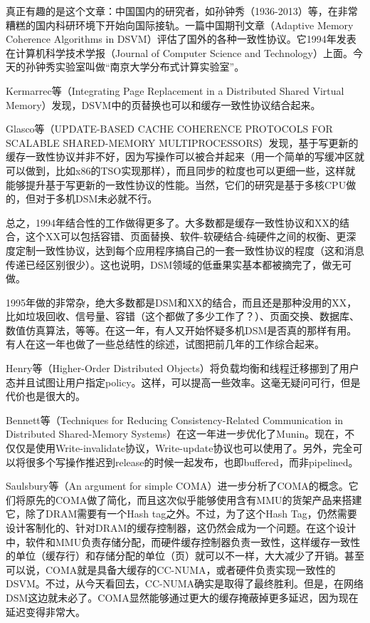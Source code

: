 \documentclass[a4paper,twoside]{scrbook}
\begin{document}
真正有趣的是这个文章：中国国内的研究者，如孙钟秀（1936-2013）等，在非常糟糕的国内科研环境下开始向国际接轨。一篇中国期刊文章（Adaptive Memory Coherence Algorithms in DSVM）评估了国外的各种一致性协议。它1994年发表在计算机科学技术学报（Journal of Computer Science and Technology）上面。今天的孙钟秀实验室叫做“南京大学分布式计算实验室”。


Kermarrec等（Integrating Page Replacement in a Distributed Shared Virtual Memory）发现，DSVM中的页替换也可以和缓存一致性协议结合起来。

Glasco等（UPDATE-BASED CACHE COHERENCE PROTOCOLS FOR SCALABLE SHARED-MEMORY MULTIPROCESSORS）发现，基于写更新的缓存一致性协议并非不好，因为写操作可以被合并起来（用一个简单的写缓冲区就可以做到，比如x86的TSO实现那样），而且同步的粒度也可以更细一些，这样就能够提升基于写更新的一致性协议的性能。当然，它们的研究是基于多核CPU做的，但对于多机DSM未必就不行。

总之，1994年结合性的工作做得更多了。大多数都是缓存一致性协议和XX的结合，这个XX可以包括容错、页面替换、软件-软硬结合-纯硬件之间的权衡、更深度定制一致性协议，达到每个应用程序搞自己的一套一致性协议的程度（这和消息传递已经区别很少）。这也说明，DSM领域的低垂果实基本都被摘完了，做无可做。


1995年做的非常杂，绝大多数都是DSM和XX的结合，而且还是那种没用的XX，比如垃圾回收、信号量、容错（这个都做了多少工作了？）、页面交换、数据库、数值仿真算法，等等。在这一年，有人又开始怀疑多机DSM是否真的那样有用。有人在这一年也做了一些总结性的综述，试图把前几年的工作综合起来。

Henry等（Higher-Order Distributed Objects）将负载均衡和线程迁移挪到了用户态并且试图让用户指定policy。这样，可以提高一些效率。这毫无疑问可行，但是代价也是很大的。

Bennett等（Techniques for Reducing Consistency-Related Communication in Distributed Shared-Memory Systems）在这一年进一步优化了Munin。现在，不仅仅是使用Write-invalidate协议，Write-update协议也可以使用了。另外，完全可以将很多个写操作推迟到release的时候一起发布，也即buffered，而非pipelined。

Saulsbury等（An argument for simple COMA）进一步分析了COMA的概念。它们将原先的COMA做了简化，而且这次似乎能够使用含有MMU的货架产品来搭建它，除了DRAM需要有一个Hash tag之外。不过，为了这个Hash Tag，仍然需要设计客制化的、针对DRAM的缓存控制器，这仍然会成为一个问题。在这个设计中，软件和MMU负责存储分配，而硬件缓存控制器负责一致性，这样缓存一致性的单位（缓存行）和存储分配的单位（页）就可以不一样，大大减少了开销。甚至可以说，COMA就是具备大缓存的CC-NUMA，或者硬件负责实现一致性的DSVM。不过，从今天看回去，CC-NUMA确实是取得了最终胜利。但是，在网络DSM这边就未必了。COMA显然能够通过更大的缓存掩蔽掉更多延迟，因为现在延迟变得非常大。
\end{document}
